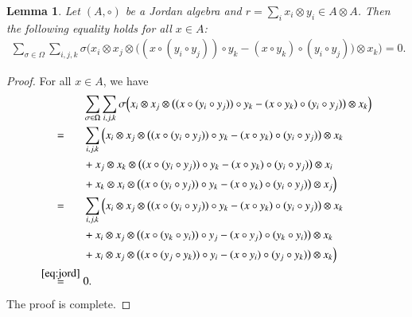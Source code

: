 \documentclass[12pt, reqno, a4paper]{amsart}
\newtheorem{lemma}[theorem]{Lemma}
\theoremstyle{definition}
\begin{document}
\begin{lemma}\label{lem:pr}
	Let $(A, \circ)$ be a Jordan algebra and $r = \sum\nolimits_{i} x_i \otimes y_i \in A \otimes A$.
	Then the following equality holds for all $x \in A$:
	\begin{align}
		\sum_{\sigma\in \Omega} \sum_{i, j, k} \sigma\Big(x_i \otimes x_j \otimes \big((x \circ (y_i \circ y_j) )\circ y_k - (x \circ y_k) \circ (y_i \circ y_j) \big)\otimes x_k\Big) = 0. \label{eq:pr1}
	\end{align}
\end{lemma}
\begin{proof}
	For all $x \in A$, we have
	\begin{align*}
		& \sum_{\sigma\in \Omega} \sum_{i, j, k} \sigma\Big(x_i \otimes x_j \otimes \big((x \circ (y_i \circ y_j) )\circ y_k - (x \circ y_k) \circ (y_i \circ y_j) \big)\otimes x_k\Big) \\
		\overset{\hphantom{\eqref{eq:jord}}}{=} \; & \sum_{i, j, k} \Big(x_i \otimes x_j \otimes \big((x \circ (y_i \circ y_j) )\circ y_k - (x \circ y_k) \circ (y_i \circ y_j) \big)\otimes x_k \\
		& + x_j \otimes x_k \otimes \big((x \circ (y_i \circ y_j) )\circ y_k - (x \circ y_k) \circ (y_i \circ y_j) \big)\otimes x_i \\
		& + x_k \otimes x_i \otimes \big((x \circ (y_i \circ y_j) )\circ y_k - (x \circ y_k) \circ (y_i \circ y_j) \big)\otimes x_j\Big) \\
		\overset{\hphantom{\eqref{eq:jord}}}{=} \; & \sum_{i, j, k} \Big(x_i \otimes x_j \otimes \big((x \circ (y_i \circ y_j) )\circ y_k - (x \circ y_k) \circ (y_i \circ y_j) \big)\otimes x_k \\
		& + x_i \otimes x_j \otimes \big((x \circ (y_k \circ y_i) )\circ y_j - (x \circ y_j) \circ (y_k \circ y_i) \big)\otimes x_k \\
		& + x_i \otimes x_j \otimes \big((x \circ (y_j \circ y_k) )\circ y_i - (x \circ y_i) \circ (y_j \circ y_k) \big)\otimes x_k\Big) \\
		\overset{\eqref{eq:jord}}{=}\; & 0.
	\end{align*}
	The proof is complete.
\end{proof}
\end{document}
